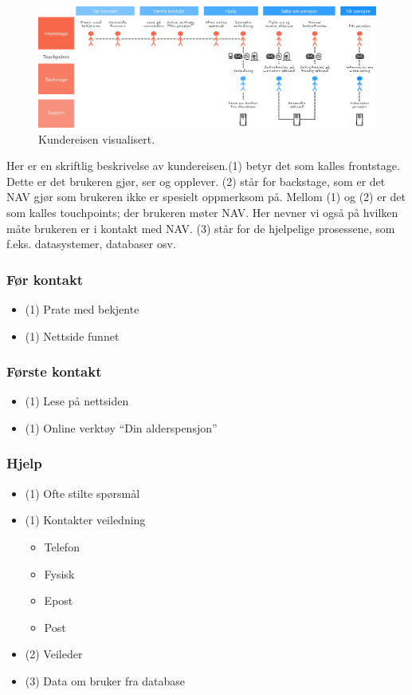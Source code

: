 \documentclass[informationsecurity]{gucmasterproject}
\begin{document}
\begin{figure}[h!]
	\centering
	\includegraphics[width=59em, angle=270]{kundereise}
	\caption{Kundereisen visualisert.}
	\label{fig:kundereise}
\end{figure}

Her er en skriftlig beskrivelse av kundereisen.(1) betyr det som kalles frontstage. Dette er det brukeren gjør, ser og opplever. (2) står for backstage, som er det NAV gjør som brukeren ikke er spesielt oppmerksom på. Mellom (1) og (2) er det som kalles touchpoints; der brukeren møter NAV. Her nevner vi også på hvilken måte brukeren er i kontakt med NAV. (3) står for de hjelpelige prosessene, som f.eks. datasystemer, databaser osv.

\subsubsection{Før kontakt}
\begin{itemize}
\item (1) Prate med bekjente
\item (1) Nettside funnet
\end{itemize}

\subsubsection{Første kontakt}
\begin{itemize}
\item (1) Lese på nettsiden
\item (1) Online verktøy “Din alderspensjon”
\end{itemize}

\subsubsection{Hjelp}
\begin{itemize}
\item (1) Ofte stilte spørsmål
\item (1) Kontakter veiledning
	\begin{itemize}
	\item Telefon
	\item Fysisk
	\item Epost
	\item Post
	\end{itemize}
\item (2) Veileder
\item (3) Data om bruker fra database
\end{itemize}
\end{document}
